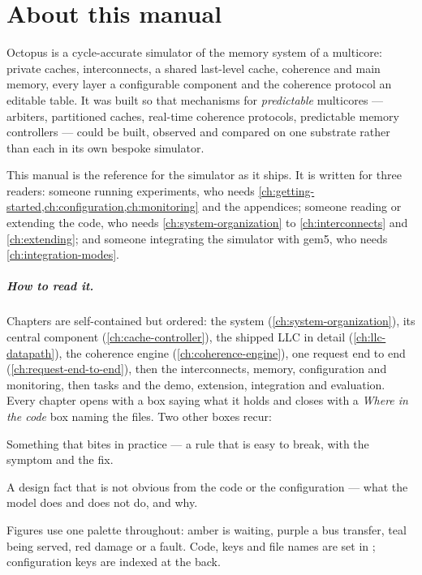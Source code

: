 \chapter*{About this manual}

Octopus is a cycle-accurate simulator of the memory system of a multicore: private caches,
interconnects, a shared last-level cache, coherence and main memory, every layer a configurable
component and the coherence protocol an editable table. It was built so that mechanisms for
\emph{predictable} multicores --- arbiters, partitioned caches, real-time coherence protocols,
predictable memory controllers --- could be built, observed and compared on one substrate rather
than each in its own bespoke simulator.

This manual is the reference for the simulator as it ships. It is written for three
readers: someone running experiments, who needs
\cref{ch:getting-started,ch:configuration,ch:monitoring} and the appendices; someone reading or
extending the code, who needs \cref{ch:system-organization} to \cref{ch:interconnects} and
\cref{ch:extending}; and someone integrating the simulator with gem5, who needs
\cref{ch:integration-modes}.

\paragraph{How to read it.} Chapters are self-contained but ordered: the system
(\cref{ch:system-organization}), its central component (\cref{ch:cache-controller}), the
shipped LLC in detail (\cref{ch:llc-datapath}), the coherence engine
(\cref{ch:coherence-engine}), one request end to end (\cref{ch:request-end-to-end}), then the
interconnects, memory, configuration and monitoring, then tasks and the demo, extension,
integration and evaluation. Every chapter opens with a box saying what it holds
and closes with a \emph{Where in the code} box naming the files. Two other boxes recur:

\begin{trapbox}
Something that bites in practice --- a rule that is easy to break, with the symptom and the
fix.
\end{trapbox}
\begin{notebox}
A design fact that is not obvious from the code or the configuration --- what the model does
and does not do, and why.
\end{notebox}

Figures use one palette throughout: \textcolor{octamber}{amber} is waiting, \textcolor{octpurple}{purple} a
bus transfer, \textcolor{octteal}{teal} being served, \textcolor{octred}{red} damage or a fault. Code,
keys and file names are set in ; configuration keys are indexed at the back.

